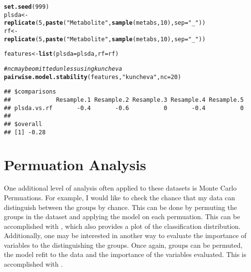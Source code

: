 \documentclass[12pt]{article}\usepackage[]{graphicx}\usepackage[usenames,dvipsnames]{color}
\makeatletter
\newcommand{\hlnum}[1]{\textcolor[rgb]{0.686,0.059,0.569}{#1}}%
\newcommand{\hlstr}[1]{\textcolor[rgb]{0.192,0.494,0.8}{#1}}%
\newcommand{\hlcom}[1]{\textcolor[rgb]{0.678,0.584,0.686}{\textit{#1}}}%
\newcommand{\hlstd}[1]{\textcolor[rgb]{0.345,0.345,0.345}{#1}}%
\newcommand{\hlkwb}[1]{\textcolor[rgb]{0.69,0.353,0.396}{#1}}%
\newcommand{\hlkwc}[1]{\textcolor[rgb]{0.333,0.667,0.333}{#1}}%
\newcommand{\hlkwd}[1]{\textcolor[rgb]{0.737,0.353,0.396}{\textbf{#1}}}%
\newenvironment{kframe}{%
 \def\at@end@of@kframe{}%
 \ifinner\ifhmode%
  \def\at@end@of@kframe{\end{minipage}}%
  \begin{minipage}{\columnwidth}%
 \fi\fi%
 \def\FrameCommand##1{\hskip\@totalleftmargin \hskip-\fboxsep
 \colorbox{shadecolor}{##1}\hskip-\fboxsep
     \hskip-\linewidth \hskip-\@totalleftmargin \hskip\columnwidth}%
 \MakeFramed {\advance\hsize-\width
   \@totalleftmargin\z@ \linewidth\hsize
   \@setminipage}}%
 {\par\unskip\endMakeFramed%
 \at@end@of@kframe}
\newenvironment{knitrout}{}{} %
\makeatother
\begin{document}
\begin{knitrout}
\color{fgcolor}\begin{kframe}
\begin{alltt}
\hlkwd{set.seed}\hlstd{(}\hlnum{999}\hlstd{)}
\hlstd{plsda} \hlkwb{<-}
    \hlkwd{replicate}\hlstd{(}\hlnum{5}\hlstd{,} \hlkwd{paste}\hlstd{(}\hlstr{"Metabolite"}\hlstd{,} \hlkwd{sample}\hlstd{(metabs,} \hlnum{10}\hlstd{),} \hlkwc{sep}\hlstd{=}\hlstr{"_"}\hlstd{))}
\hlstd{rf} \hlkwb{<-}
    \hlkwd{replicate}\hlstd{(}\hlnum{5}\hlstd{,} \hlkwd{paste}\hlstd{(}\hlstr{"Metabolite"}\hlstd{,} \hlkwd{sample}\hlstd{(metabs,} \hlnum{10}\hlstd{),} \hlkwc{sep}\hlstd{=}\hlstr{"_"}\hlstd{))}

\hlstd{features} \hlkwb{<-} \hlkwd{list}\hlstd{(}\hlkwc{plsda}\hlstd{=plsda,} \hlkwc{rf}\hlstd{=rf)}

\hlcom{# nc may be omitted unless using kuncheva}
\hlkwd{pairwise.model.stability}\hlstd{(features,} \hlstr{"kuncheva"}\hlstd{,} \hlkwc{nc}\hlstd{=}\hlnum{20}\hlstd{)}
\end{alltt}
\begin{verbatim}
## $comparisons
##             Resample.1 Resample.2 Resample.3 Resample.4 Resample.5
## plsda.vs.rf       -0.4       -0.6          0       -0.4          0
## 
## $overall
## [1] -0.28
\end{verbatim}
\end{kframe}
\end{knitrout}

\newpage
\section{Permuation Analysis}

One additional level of analysis often applied to these datasets is Monte
Carlo Permuations.  For example, I would like to check the chance that
my data can distinguish between the groups by chance.  This can be done by
permuting the groups in the dataset and applying the model on each permuation.
This can be accomplished with , which also provides a 
plot of the classification distribution.  Additionally, one may
be interested in another way to evaluate the importance of variables to the 
distinguishing the groups.  Once again, groups can be permuted, the model
refit to the data and the importance of the variables evaluated.  This is
accomplished with .
\end{document}
